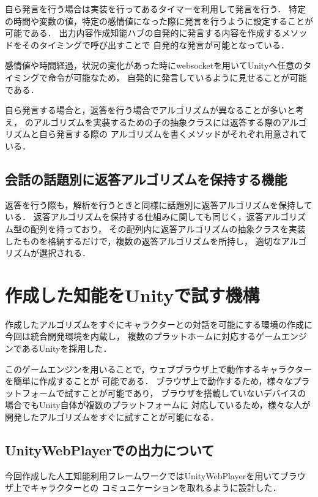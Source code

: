 自ら発言を行う場合は実装を行ってあるタイマーを利用して発言を行う．
特定の時間や変数の値，特定の感情値になった際に発言を行うように設定することが可能である．
出力内容作成知能ハブの自発的に発言する内容を作成するメソッドをそのタイミングで呼び出すことで
自発的な発言が可能となっている．

感情値や時間経過，状況の変化があった時にwebsocketを用いてUnityへ任意のタイミングで命令が可能なため，
自発的に発言しているように見せることが可能である．

自ら発言する場合と，返答を行う場合でアルゴリズムが異なることが多いと考え，
のアルゴリズムを実装するための子の抽象クラスには返答する際のアルゴリズムと自ら発言する際の
アルゴリズムを書くメソッドがそれぞれ用意されている．

\subsection{会話の話題別に返答アルゴリズムを保持する機能}
返答を行う際も，解析を行うときと同様に話題別に返答アルゴリズムを保持している．
返答アルゴリズムを保持する仕組みに関しても同じく，返答アルゴリズム型の配列を持っており，
その配列内に返答アルゴリズムの抽象クラスを実装したものを格納するだけで，複数の返答アルゴリズムを所持し，
適切なアルゴリズムが選択される．

\newpage
\section{作成した知能をUnityで試す機構}
作成したアルゴリズムをすぐにキャラクターとの対話を可能にする環境の作成に今回は統合開発環境を内蔵し，
複数のプラットホームに対応するゲームエンジンであるUnityを採用した．

このゲームエンジンを用いることで，ウェブブラウザ上で動作するキャラクターを簡単に作成することが
可能である．
ブラウザ上で動作するため，様々なプラットフォームで試すことが可能であり，
ブラウザを搭載していないデバイスの場合でもUnity自体が複数のプラットフォームに
対応しているため，様々な人が開発したアルゴリズムをすぐに試すことが可能になる．

\subsection{UnityWebPlayerでの出力について}
今回作成した人工知能利用フレームワークではUnityWebPlayerを用いてブラウザ上でキャラクターとの
コミュニケーションを取れるように設計した．

